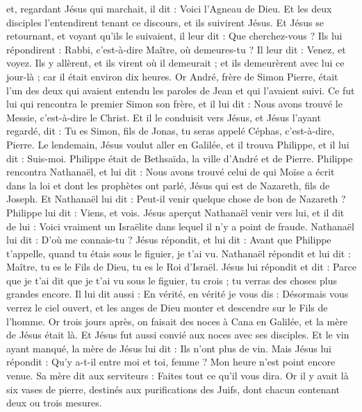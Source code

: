 \begin{multicols}{2}
et, regardant Jésus qui marchait, il dit : Voici l'Agneau de Dieu.
Et les deux disciples l'entendirent tenant ce discours, et ils suivirent Jésus.
Et Jésus se retournant, et voyant qu'ils le suivaient, il leur dit : Que cherchez-vous ? Ils lui répondirent : Rabbi, c'est-à-dire Maître, où demeures-tu ?
Il leur dit : Venez, et voyez. Ils y allèrent, et ils virent où il demeurait ; et ils demeurèrent avec lui ce jour-là ; car il était environ dix heures.
Or André, frère de Simon Pierre, était l'un des deux qui avaient entendu les paroles de Jean et qui l'avaient suivi.
Ce fut lui qui rencontra le premier Simon son frère, et il lui dit : Nous avons trouvé le Messie, c'est-à-dire le Christ.
Et il le conduisit vers Jésus, et Jésus l'ayant regardé, dit : Tu es Simon, fils de Jonas, tu seras appelé Céphas, c'est-à-dire, Pierre.
Le lendemain, Jésus voulut aller en Galilée, et il trouva Philippe, et il lui dit : Suis-moi.
Philippe était de Bethsaïda, la ville d'André et de Pierre.
Philippe rencontra Nathanaël, et lui dit : Nous avons trouvé celui de qui Moïse a écrit dans la loi et dont les prophètes ont parlé, Jésus qui est de Nazareth, fils de Joseph.
Et Nathanaël lui dit : Peut-il venir quelque chose de bon de Nazareth ? Philippe lui dit : Viens, et vois.
Jésus aperçut Nathanaël venir vers lui, et il dit de lui : Voici vraiment un Israëlite dans lequel il n'y a point de fraude.
Nathanaël lui dit : D'où me connais-tu ? Jésus répondit, et lui dit : Avant que Philippe t'appelle, quand tu étais sous le figuier, je t'ai vu.
Nathanaël répondit et lui dit : Maître, tu es le Fils de Dieu, tu es le Roi d'Israël.
Jésus lui répondit et dit : Parce que je t'ai dit que je t'ai vu sous le figuier, tu crois ; tu verras des choses plus grandes encore.
Il lui dit aussi : En vérité, en vérité je vous dis : Désormais vous verrez le ciel ouvert, et les anges de Dieu monter et descendre sur le Fils de l'homme.
\VerseOne{}Or trois jours après, on faisait des noces à Cana en Galilée, et la mère de Jésus était là.
Et Jésus fut aussi convié aux noces avec ses disciples.
Et le vin ayant manqué, la mère de Jésus lui dit : Ils n'ont plus de vin.
Mais Jésus lui répondit : Qu'y a-t-il entre moi et toi, femme ? Mon heure n'est point encore venue.
Sa mère dit aux serviteurs : Faites tout ce qu'il vous dira.
Or il y avait là six vases de pierre, destinés aux purifications des Juifs, dont chacun contenant deux ou trois mesures.

\end{multicols}
